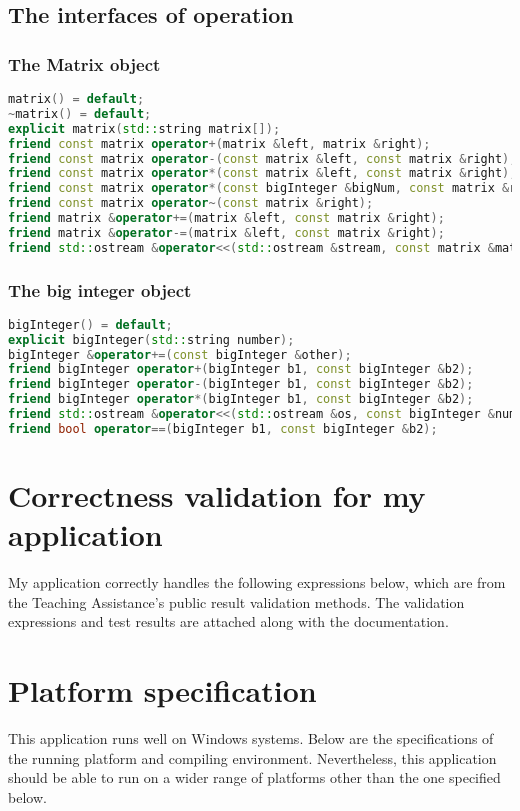 \documentclass[a4paper]{report}
\begin{document}
\section{The interfaces of operation}
\subsection{The Matrix object}
\begin{lstlisting}[language=C++]
matrix() = default;
~matrix() = default;
explicit matrix(std::string matrix[]);
friend const matrix operator+(matrix &left, matrix &right);
friend const matrix operator-(const matrix &left, const matrix &right);
friend const matrix operator*(const matrix &left, const matrix &right);
friend const matrix operator*(const bigInteger &bigNum, const matrix &right);
friend const matrix operator~(const matrix &right);
friend matrix &operator+=(matrix &left, const matrix &right);
friend matrix &operator-=(matrix &left, const matrix &right);
friend std::ostream &operator<<(std::ostream &stream, const matrix &matrix1);
\end{lstlisting}

\subsection{The big integer object}

\begin{lstlisting}[language=C++]
bigInteger() = default;
explicit bigInteger(std::string number);
bigInteger &operator+=(const bigInteger &other);
friend bigInteger operator+(bigInteger b1, const bigInteger &b2);
friend bigInteger operator-(bigInteger b1, const bigInteger &b2);
friend bigInteger operator*(bigInteger b1, const bigInteger &b2);
friend std::ostream &operator<<(std::ostream &os, const bigInteger &num);
friend bool operator==(bigInteger b1, const bigInteger &b2);
\end{lstlisting}


\chapter{Correctness validation for my application}
My application correctly handles the following expressions below, which are from the Teaching Assistance's public result validation methods. 
The validation expressions and test results are attached along with the documentation.
\chapter{Platform specification}
This application runs well on Windows systems. Below are the specifications of the running platform and compiling environment. Nevertheless, this application should be able to run on a wider range of platforms other than the one specified below.
\end{document}
